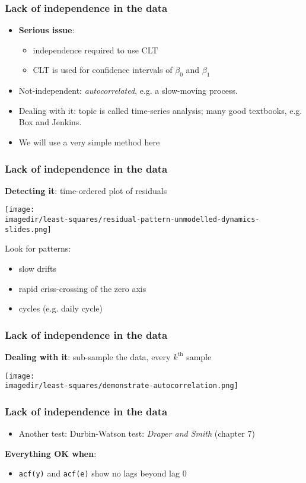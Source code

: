 \begin{frame}\frametitle{Lack of independence in the data}
	\begin{itemize}
		\item	\textbf{Serious issue}:
		\begin{itemize}
			\item	independence required to use CLT
			\item	CLT is used for confidence intervals of $\beta_0$ and $\beta_1$
		\end{itemize}
		\item	Not-independent: \emph{autocorrelated}, e.g. a slow-moving process.
		\item	Dealing with it: topic is called time-series analysis; many good textbooks, e.g. Box and Jenkins.
		\item	We will use a very simple method here
	\end{itemize}
\end{frame}

\begin{frame}\frametitle{Lack of independence in the data}

	\textbf{Detecting it}: time-ordered plot of residuals
	\begin{center}
		\texttt{[image: \\imagedir/least-squares/residual-pattern-unmodelled-dynamics-slides.png]}
	\end{center}
	Look for patterns:
	\begin{itemize}
		\item	slow drifts
		\item	rapid criss-crossing of the zero axis
		\item	cycles (e.g. daily cycle)
	\end{itemize}
\end{frame}

\begin{frame}\frametitle{Lack of independence in the data}

	\textbf{Dealing with it}: sub-sample the data, every $k^\text{th}$ sample
	\begin{center}
		\texttt{[image: \\imagedir/least-squares/demonstrate-autocorrelation.png]}
	\end{center}
\end{frame}

\begin{frame}\frametitle{Lack of independence in the data}
	\begin{itemize}
		\item	Another test: Durbin-Watson test: \emph{Draper and Smith} (chapter 7)
	\end{itemize}

	\textbf{Everything OK when}:
	\begin{itemize}
		\item	\texttt{acf(y)} and \texttt{acf(e)} show no lags beyond lag 0
	\end{itemize}
\end{frame}

